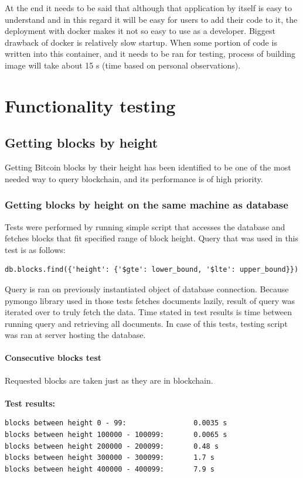\documentclass[12pt, en, eng, oneside, final]{mgr}
\begin{document}
At the end it needs to be said that although that application by itself is easy to understand and in this regard it will be easy for users to add their code to it, the deployment with docker makes it not so easy to use as a developer. Biggest drawback of docker is relatively slow startup. When some portion of code is written into this container, and it needs to be ran for testing, process of building image will take about 15 s (time based on personal observations).

\chapter{Functionality testing}

\section{Getting blocks by height}
Getting Bitcoin blocks by their height has been identified to be one of the most needed way to query blockchain, and its performance is of high priority.

 
\subsection{Getting blocks by height on the same machine as database} 
Tests were performed by running simple script that accesses the database and fetches blocks that fit specified range of block height. Query that was used in this test is as follows: 
\begin{verbatim}
db.blocks.find({'height': {'$gte': lower_bound, '$lte': upper_bound}})
\end{verbatim}
Query is ran on previously instantiated object of database connection. Because pymongo library used in those tests fetches documents lazily, result of query was iterated over to truly fetch the data. Time stated in test results is time between running query and retrieving all documents. In case of this tests, testing script was ran at server hosting the database.

\subsubsection{Consecutive blocks test}
Requested blocks are taken just as they are in blockchain.
\\
\\
\textbf{Test results:}
\begin{verbatim}
blocks between height 0 - 99:                0.0035 s
blocks between height 100000 - 100099:       0.0065 s
blocks between height 200000 - 200099:       0.48 s
blocks between height 300000 - 300099:       1.7 s
blocks between height 400000 - 400099:       7.9 s
\end{verbatim}
\end{document}
